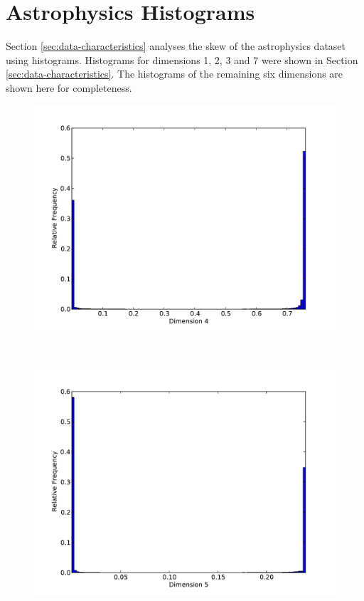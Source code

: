 \newpage

\section{Astrophysics Histograms}
\label{sec:app-histograms}

Section \ref{sec:data-characteristics} analyses the skew of the astrophysics dataset using histograms. Histograms for dimensions 1, 2, 3 and 7 were shown in Section \ref{sec:data-characteristics}. The histograms of the remaining six dimensions are shown here for completeness.

\begin{figure}[h]
	\begin{center}
		\begin{subfloat}{%
			\includegraphics[scale=0.36]{figures/histograms/astrophysics_500000_3.pdf}
		}
		\end{subfloat}~
		\begin{subfloat}{%
			\includegraphics[scale=0.36]{figures/histograms/astrophysics_500000_4.pdf}
		}
		\end{subfloat}~
	\end{center}
\end{figure}

